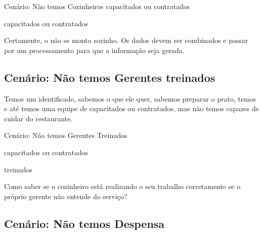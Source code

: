     \begin{env-cenario2}{Cenário: Não temos Cozinheiros capacitados ou contratados}
            \mschecksim \xspace \CLIENTE 
            
            \mschecksim \xspace \CARDAPIO  

            \mschecksim \xspace \LIVRODERECEITAS
            
            \mschecksim \xspace \FOGAO

            \mschecknao \xspace \COZINHEIROS \xspace capacitados ou contratados
    \end{env-cenario2}
    
    Certamente, o \PRATO \xspace não se monta sozinho. Os dados devem ser combinados e passar por um processamento para que a informação seja gerada.

\subsection{Cenário: Não temos Gerentes treinados}   

     Temos um \CLIENTE \xspace identificado, sabemos o que ele quer, sabemos preparar o prato, temos \FOGAO \xspace e até temos uma equipe de \COZINHEIROS \xspace capacitados ou contratados, mas não temos \GERENTES \xspace capazes de cuidar do restaurante.

    \begin{env-cenario2}{Cenário: Não temos Gerentes Treinados}
            \mschecksim \xspace \CLIENTE 
            
            \mschecksim \xspace \CARDAPIO  

            \mschecksim \xspace \LIVRODERECEITAS
            
            \mschecksim \xspace \FOGAO

            \mschecksim \xspace \COZINHEIROS \xspace capacitados ou contratados
        
            \mschecknao \xspace \GERENTES \xspace treinados
    \end{env-cenario2}

    Como saber se o cozinheiro está realizando o seu trabalho corretamente se o próprio gerente não entende do serviço?

\subsection{Cenário: Não temos Despensa}
\label{sub-cenario-naotemosdespensa}

